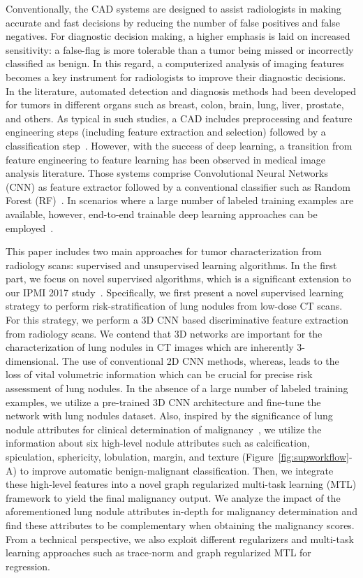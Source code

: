 \documentclass[journal]{IEEEtran}
\begin{document}
Conventionally, the CAD systems are designed to assist radiologists in making accurate and fast decisions by reducing the number of false positives and false negatives. For diagnostic decision making, a higher emphasis is laid on increased sensitivity: a false-flag is more tolerable than a tumor being missed or incorrectly classified as benign. In this regard, a computerized analysis of imaging features becomes a key instrument for radiologists to improve their diagnostic decisions. In the literature, automated detection and diagnosis methods had been developed for tumors in different organs such as breast, colon, brain, lung, liver, prostate, and others. As typical in such studies, a CAD includes preprocessing and feature engineering steps (including feature extraction and selection) followed by a classification step~\cite{el20113d,han2015texture,way2006computer,lee2010computer}. However, with the success of deep learning, a transition from feature engineering to feature learning has been observed in medical image analysis literature. Those systems comprise Convolutional Neural Networks (CNN) as feature extractor followed by a conventional classifier such as Random Forest (RF)~\cite{kumar2015lung,buty2016characterization}. In scenarios where a large number of labeled training examples are available, however, end-to-end trainable deep learning approaches can be employed~\cite{saouli2018fully}.

This paper includes two main approaches for tumor characterization from radiology scans: supervised and unsupervised learning algorithms. In the first part, we focus on novel supervised algorithms, which is a significant extension to our IPMI 2017 study~\cite{hussein2017risk}. Specifically, we first present a novel supervised learning strategy to perform risk-stratification of lung nodules from low-dose CT scans. For this strategy, we perform a 3D CNN based discriminative feature extraction from radiology scans. We contend that 3D networks are important for the characterization of lung nodules in CT images which are inherently 3-dimensional. The use of conventional 2D CNN methods, whereas, leads to the loss of vital volumetric information which can be crucial for precise risk assessment of lung nodules.
In the absence of a large number of labeled training examples, we utilize a pre-trained 3D CNN architecture and fine-tune the network with lung nodules dataset. Also, inspired by the significance of lung nodule attributes for clinical determination of malignancy~\cite{furuya1999new}, we utilize the information about six high-level nodule attributes such as calcification, spiculation, sphericity, lobulation, margin, and texture (Figure~\ref{fig:supworkflow}-A) to improve automatic benign-malignant classification. Then, we integrate these high-level features into a novel graph regularized multi-task learning (MTL) framework to yield the final malignancy output.
We analyze the impact of the aforementioned lung nodule attributes in-depth for malignancy determination and find these attributes to be complementary when obtaining the malignancy scores. From a technical perspective, we also exploit different regularizers and multi-task learning approaches such as trace-norm and graph regularized MTL for regression.
\end{document}
